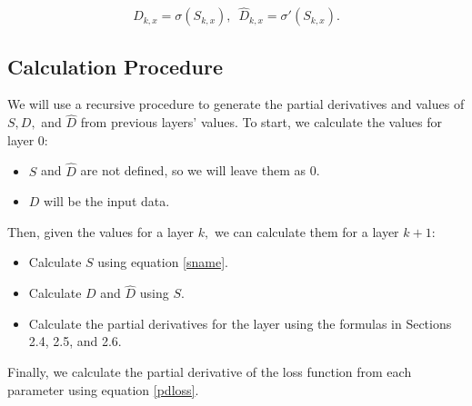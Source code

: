 \documentclass{article}
\begin{document}
$$D_{k,x} = \sigma(S_{k,x}), \,\,\, \hat D_{k,x} = \sigma'(S_{k,x}).$$

\subsection{Calculation Procedure}

We will use a recursive procedure to generate the partial derivatives and values of $S, D,$ and $\hat D$ from previous layers' values. To start, we calculate the values for layer 0:

\begin{itemize}

\item $S$ and $\hat D$ are not defined, so we will leave them as 0.

\item $D$ will be the input data.

\end{itemize}

Then, given the values for a layer $k,$ we can calculate them for a layer $k+1:$

\begin{itemize}

\item Calculate $S$ using equation \ref{sname}.

\item Calculate $D$ and $\hat D$ using $S.$

\item Calculate the partial derivatives for the layer using the formulas in Sections 2.4, 2.5, and 2.6.

\end{itemize}

Finally, we calculate the partial derivative of the loss function from each parameter using equation \ref{pdloss}.
\end{document}
